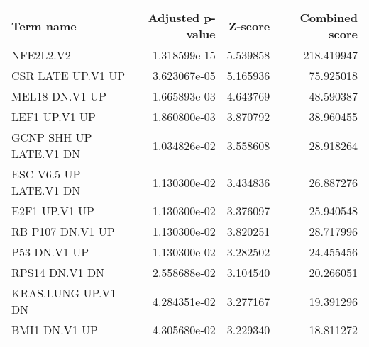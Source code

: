 \begin{tabular}{lrrr}
\toprule
             Term name &  Adjusted p-value &  Z-score &  Combined score \\
\midrule
             NFE2L2.V2 &      1.318599e-15 & 5.539858 &      218.419947 \\
     CSR LATE UP.V1 UP &      3.623067e-05 & 5.165936 &       75.925018 \\
        MEL18 DN.V1 UP &      1.665893e-03 & 4.643769 &       48.590387 \\
         LEF1 UP.V1 UP &      1.860800e-03 & 3.870792 &       38.960455 \\
GCNP SHH UP LATE.V1 DN &      1.034826e-02 & 3.558608 &       28.918264 \\
ESC V6.5 UP LATE.V1 DN &      1.130300e-02 & 3.434836 &       26.887276 \\
         E2F1 UP.V1 UP &      1.130300e-02 & 3.376097 &       25.940548 \\
      RB P107 DN.V1 UP &      1.130300e-02 & 3.820251 &       28.717996 \\
          P53 DN.V1 UP &      1.130300e-02 & 3.282502 &       24.455456 \\
        RPS14 DN.V1 DN &      2.558688e-02 & 3.104540 &       20.266051 \\
    KRAS.LUNG UP.V1 DN &      4.284351e-02 & 3.277167 &       19.391296 \\
         BMI1 DN.V1 UP &      4.305680e-02 & 3.229340 &       18.811272 \\
\bottomrule
\end{tabular}
